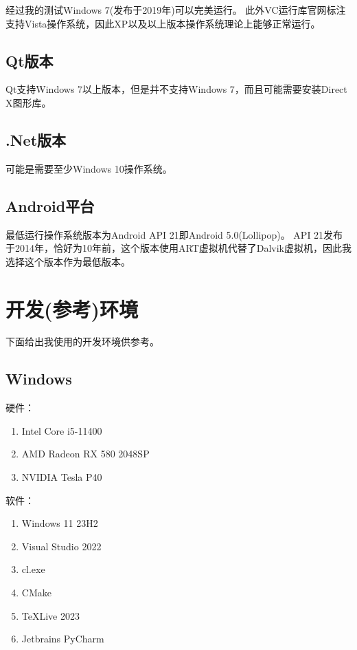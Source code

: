 经过我的测试Windows 7(发布于2019年)可以完美运行。
此外VC运行库官网标注支持Vista操作系统，因此XP以及以上版本操作系统理论上能够正常运行。

\subsection{Qt版本}

Qt支持Windows 7以上版本，但是并不支持Windows 7，而且可能需要安装Direct X图形库。

\subsection{.Net版本}

可能是需要至少Windows 10操作系统。

\subsection{Android平台}

最低运行操作系统版本为Android API 21即Android 5.0(Lollipop)。
API 21发布于2014年，恰好为10年前，这个版本使用ART虚拟机代替了Dalvik虚拟机，因此我选择这个版本作为最低版本。

\section{开发(参考)环境}

下面给出我使用的开发环境供参考。

\subsection{Windows}

硬件：
\begin{enumerate}
	\item Intel Core i5-11400
	\item AMD Radeon RX 580 2048SP
	\item NVIDIA Tesla P40
\end{enumerate}

软件：
\begin{enumerate}
	\item Windows 11 23H2
	\item Visual Studio 2022
	\item cl.exe
	\item CMake
	\item TeXLive 2023
	\item Jetbrains PyCharm
\end{enumerate}

